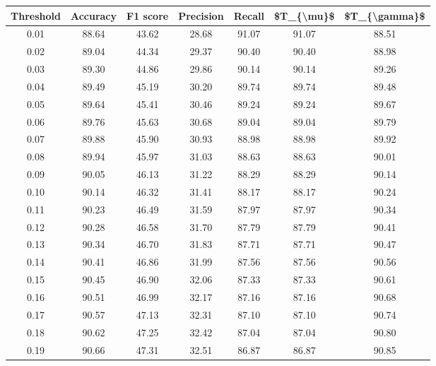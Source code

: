 \begin{tabular}{|c|c|c|c|c|c|c|}
\hline
 Threshold &  Accuracy &  F1 score &  Precision &  Recall &  \$T\_\{\textbackslash mu\}\$ &  \$T\_\{\textbackslash gamma\}\$ \\
\hline
      0.01 &     88.64 &     43.62 &      28.68 &   91.07 &      91.07 &         88.51 \\
      0.02 &     89.04 &     44.34 &      29.37 &   90.40 &      90.40 &         88.98 \\
      0.03 &     89.30 &     44.86 &      29.86 &   90.14 &      90.14 &         89.26 \\
      0.04 &     89.49 &     45.19 &      30.20 &   89.74 &      89.74 &         89.48 \\
      0.05 &     89.64 &     45.41 &      30.46 &   89.24 &      89.24 &         89.67 \\
      0.06 &     89.76 &     45.63 &      30.68 &   89.04 &      89.04 &         89.79 \\
      0.07 &     89.88 &     45.90 &      30.93 &   88.98 &      88.98 &         89.92 \\
      0.08 &     89.94 &     45.97 &      31.03 &   88.63 &      88.63 &         90.01 \\
      0.09 &     90.05 &     46.13 &      31.22 &   88.29 &      88.29 &         90.14 \\
      0.10 &     90.14 &     46.32 &      31.41 &   88.17 &      88.17 &         90.24 \\
      0.11 &     90.23 &     46.49 &      31.59 &   87.97 &      87.97 &         90.34 \\
      0.12 &     90.28 &     46.58 &      31.70 &   87.79 &      87.79 &         90.41 \\
      0.13 &     90.34 &     46.70 &      31.83 &   87.71 &      87.71 &         90.47 \\
      0.14 &     90.41 &     46.86 &      31.99 &   87.56 &      87.56 &         90.56 \\
      0.15 &     90.45 &     46.90 &      32.06 &   87.33 &      87.33 &         90.61 \\
      0.16 &     90.51 &     46.99 &      32.17 &   87.16 &      87.16 &         90.68 \\
      0.17 &     90.57 &     47.13 &      32.31 &   87.10 &      87.10 &         90.74 \\
      0.18 &     90.62 &     47.25 &      32.42 &   87.04 &      87.04 &         90.80 \\
      0.19 &     90.66 &     47.31 &      32.51 &   86.87 &      86.87 &         90.85 \\

\end{tabular}
